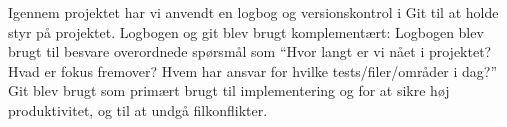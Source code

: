 Igennem projektet har vi anvendt en logbog og versionskontrol i Git til at holde styr på projektet. Logbogen og git blev brugt komplementært: Logbogen blev brugt til besvare overordnede spørsmål som “Hvor langt er vi nået i projektet? Hvad er fokus fremover? Hvem har ansvar for hvilke tests/filer/områder i dag?” Git blev brugt som primært brugt til implementering og for at sikre høj produktivitet, og til at undgå filkonflikter. 